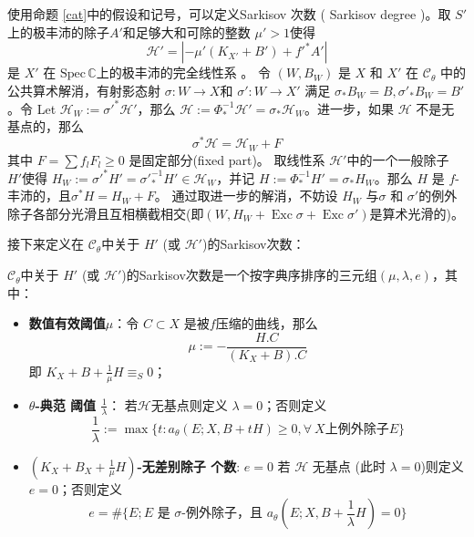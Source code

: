 使用命题 \ref{cat}中的假设和记号，可以定义Sarkisov 次数 ( Sarkisov degree )。取 $S'$ 上的极丰沛的除子$ A'  $和足够大和可除的整数 $ \mu'>1 $使得
\[ \mathcal{H}'=|-\mu' (K_{X'}+B') +f'^*A'| \]
是 $ X' $ 在 $ \mathrm{Spec}\,\mathbb{C}$上的极丰沛的完全线性系 。 令 $ (W,B_W) $ 是 $ X $ 和 $ X' $ 在 $ \mathcal{C}_{\theta} $ 中的公共算术解消，有射影态射 $ \sigma:W\to X$和   $\sigma':W\to X' $ 满足 $\sigma_*B_W=B, \sigma'_*B_W=B' $。令 Let $\mathcal{H}_W:=\sigma'^*\mathcal{H}'$，那么  $\mathcal{H}:=\Phi^{-1}_*\mathcal{H}'=\sigma_*\mathcal{H}_W$。进一步，如果 $ \mathcal{H} $ 不是无基点的，那么
\[ \sigma^*\mathcal{H}=\mathcal{H}_W+F \]
其中 $ F=\sum f_lF_l\geqslant0 $ 是固定部分(fixed part)。 取线性系 $ \mathcal{H}' $中的一个一般除子 $H'$使得 $ H_W:=\sigma'^*H'=\sigma'^{-1}_*H'\in \mathcal{H}_W $，并记 $ H:=\Phi^{-1}_*H'=\sigma_*H_{W} $。那么 $H$ 是 $f$-丰沛的，且$ \sigma^*H=H_W+F $。 通过取进一步的解消，不妨设 $H_{W}$ 与$\sigma$ 和 $\sigma'$的例外除子各部分光滑且互相横截相交(即$(W,H_{W}+ \operatorname{Exc}\sigma+ \operatorname{Exc}\sigma')$是算术光滑的)。


接下来定义在 $\mathcal{C}_{\theta}$中关于 $H'$ (或 $\mathcal{H}'$)的Sarkisov次数：
\begin{definition}\label{sarkisovdegree}
  \cite[Definition 3.8]{brunoLogSarkisovProgram1995}
 $\mathcal{C}_{\theta}$中关于 $H'$ (或 $\mathcal{H}'$)的Sarkisov次数是一个按字典序排序的三元组$ (\mu,\lambda,e) $，其中：
  \begin{itemize}
    \item \textbf{ 数值有效阈值$ \mu $}：令 $ C\subset X  $ 是被$ f $压缩的曲线，那么
          \[ \mu:=-\frac{H.C}{(K_X+B).C} \]
          即 $ K_X+B+\frac{1}{\mu} H \equiv_S0$；
    \item \textbf{$ \theta $-典范 阈值  $ \frac{1}{\lambda} $}：  若$ \mathcal{H} $无基点则定义 $\lambda=0$；否则定义
          \[ \frac{1}{\lambda}:=\max\{t:a_{\theta}(E;X,B+tH)\geqslant 0,  \forall \ X\text{上例外除子}E \}\]
    \item \textbf{ $(K_{X}+B_{X}+\frac{1}{\mu}H)$-无差别除子 个数}:  $ e=0 $ 若 $ \mathcal{H} $ 无基点 (此时 $ \lambda=0 $)则定义  $e=0$；否则定义
          \[ e=\#\{E; E \text{ 是 }\sigma\text{-例外除子，且 } a_{\theta}(E;X,B+\frac{1}{\lambda} H)=0 \} \]
  \end{itemize}
\end{definition}


